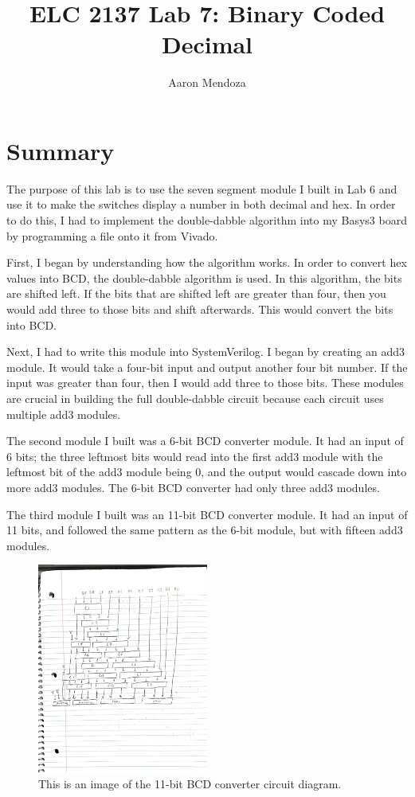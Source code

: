 \documentclass[11pt]{article}
\begin{document}
\title{ELC 2137 Lab 7: Binary Coded Decimal}
\author{Aaron Mendoza}

\maketitle


\section*{Summary}

The purpose of this lab is to use the seven segment module I built in Lab 6 and use it to make the switches display a number in both decimal and hex. In order to do this, I had to implement the double-dabble algorithm into my Basys3 board by programming a file onto it from Vivado.

First, I began by understanding how the algorithm works. In order to convert hex values into BCD, the double-dabble algorithm is used. In this algorithm, the bits are shifted left. If the bits that are shifted left are greater than four, then you would add three to those bits and shift afterwards. This would convert the bits into BCD. 

Next, I had to write this module into SystemVerilog. I began by creating an add3 module. It would take a four-bit input and output another four bit number. If the input was greater than four, then I would add three to those bits. These modules are crucial in building the full double-dabble circuit because each circuit uses multiple add3 modules.

The second module I built was a 6-bit BCD converter module. It had an input of 6 bits; the three leftmost bits would read into the first add3 module with the leftmost bit of the add3 module being 0, and the output would cascade down into more add3 modules. The 6-bit BCD converter had only three add3 modules.

The third module I built was an 11-bit BCD converter module. It had an input of 11 bits, and followed the same pattern as the 6-bit module, but with fifteen add3 modules. 

\begin{figure}[ht]\centering
\includegraphics[width=0.5\textwidth]{eleven_BCD_diag}
\caption{This is an image of the 11-bit BCD converter circuit diagram.}
\label{fig:original_logo}
\end{figure}
\end{document}
